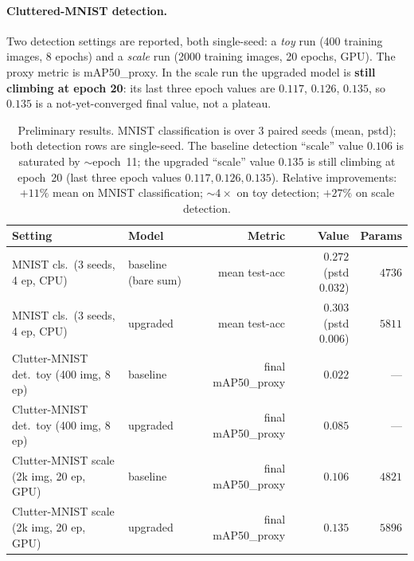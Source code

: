 \documentclass[11pt]{article}
\begin{document}
\paragraph{Cluttered-MNIST detection.}
Two detection settings are reported, both single-seed: a \emph{toy} run
(400 training images, 8 epochs) and a \emph{scale} run (2000 training images,
20 epochs, GPU). The proxy metric is mAP50\_proxy. In the scale run the upgraded
model is \textbf{still climbing at epoch 20}: its last three epoch values are
$0.117$, $0.126$, $0.135$, so $0.135$ is a not-yet-converged final value, not a
plateau.

\begin{table}[ht]
\centering\footnotesize
\setlength{\tabcolsep}{3.2pt}
\begin{tabular}{@{}llrrr@{}}
\toprule
Setting & Model & Metric & Value & Params \\
\midrule
MNIST cls.\ (3 seeds, 4 ep, CPU)    & baseline (bare sum) & mean test-acc & $0.272$ (pstd $0.032$) & $4736$ \\
MNIST cls.\ (3 seeds, 4 ep, CPU)    & upgraded            & mean test-acc & $0.303$ (pstd $0.006$) & $5811$ \\
\midrule
Clutter-MNIST det.\ toy (400 img, 8 ep)   & baseline & final mAP50\_proxy & $0.022$ & --- \\
Clutter-MNIST det.\ toy (400 img, 8 ep)   & upgraded & final mAP50\_proxy & $0.085$ & --- \\
\midrule
Clutter-MNIST scale (2k img, 20 ep, GPU) & baseline & final mAP50\_proxy & $0.106$ & $4821$ \\
Clutter-MNIST scale (2k img, 20 ep, GPU) & upgraded & final mAP50\_proxy & $0.135$ & $5896$ \\
\bottomrule
\end{tabular}
\caption{Preliminary results. MNIST classification is over 3 paired seeds
(mean, pstd); both detection rows are single-seed. The baseline detection
``scale'' value $0.106$ is saturated by $\sim$epoch~11; the upgraded
``scale'' value $0.135$ is still climbing at epoch~20 (last three epoch
values $0.117, 0.126, 0.135$). Relative improvements: $+11\%$ mean on MNIST
classification; $\sim\!4\times$ on toy detection; $+27\%$ on scale detection.}
\label{tab:results}
\end{table}
\end{document}
